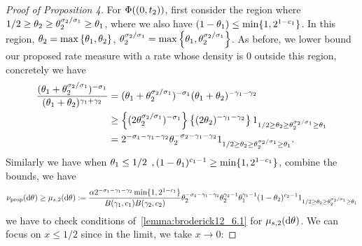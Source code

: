 \begin{proof}[Proof of Proposition 4]
For $\Phi((0, t_2))$, first consider the region where $1/2 \ge \theta_{2} \ge \theta_{2}^{\sigma_{2}/\sigma_{1}}\ge \theta_{1}  $, where we also have $(1-\theta_{1})\le \min\{1, 2^{1-c_{1}}\}$. In this region, $\theta_{2}=\max\left\{\theta_{1},\theta_{2}\right\}$, $\theta_{2}^{\sigma_{2}/\sigma_{1}}=\max\left\{\theta_{1}, \theta_{2}^{\sigma_{2}/\sigma_{1}}\right\}$. As before, we lower bound our proposed rate measure with a rate whose density is 0 outside this region, concretely we have
\begin{align*}
        \frac{(\variantfreqperpop{1}+\variantfreqperpop{2}^{\rate{2}/\rate{1}})^{-\rate{1}}}{(\variantfreqperpop{1}+\variantfreqperpop{2})^{\corr{1}+\corr{2}}}&=(\variantfreqperpop{1}+\variantfreqperpop{2}^{\rate{2}/\rate{1}})^{-\rate{1}}(\variantfreqperpop{1}+\variantfreqperpop{2})^{-\corr{1}-\corr{2}}\\
        &\ge \left\{ (2\variantfreqperpop{2}^{\rate{2}/\rate{1}} )^{-\rate{1}} \right\} \left\{(2\variantfreqperpop{2})^{-\corr{1} - \corr{2}} \right\}\bm{1}_{1/2 \ge \variantfreqperpop{2} \ge \variantfreqperpop{2}^{\rate{2}/\rate{1}}\ge \variantfreqperpop{1}} \\
        &= 2^{-\rate{1}-\corr{1}-\corr{2}} \variantfreqperpop{2}^{-\rate{2}-\corr{1}-\corr{2}}\bm{1}_{1/2 \ge \variantfreqperpop{2} \ge \variantfreqperpop{2}^{\rate{2}/\rate{1}}\ge \variantfreqperpop{1}}.
\end{align*}
Similarly we have when $\theta_{1}\le 1/2$ $,(1-\theta_{1})^{c_{1}-1}\ge \min\{1, 2^{1-c_{1}}\}$, combine the bounds, we have 
\begin{align*}
    \ratemeasproposed(\de\vecvariantfreq{})\ge\mu_{s,2}(\de\vecvariantfreq{}):= \frac{\mass 2^{-\rate{1}-\corr{1}-\corr{2}}\min\{1, 2^{1-\conc{1}}\}}{B(\corr{1}, \conc{1})B(\corr{2}, \conc{2})}\variantfreqperpop{2}^{-\rate{2}-\corr{1}-\corr{2}} \variantfreqperpop{2}^{\corr{2}-1}\variantfreqperpop{1}^{\corr{1}-1}(1-\variantfreqperpop{2})^{\conc{2}-1} \bm{1}_{1/2 \ge \variantfreqperpop{2} \ge \variantfreqperpop{2}^{\rate{2}/\rate{1}}\ge \variantfreqperpop{1}}
\end{align*}
we have to check conditions of~\cref{lemma:broderick12_6.1} for $\mu_{s,2}(\de\vecvariantfreq{})$. We can focus on $x\le 1/2$ since in the limit, we take $x\to 0$:

\end{proof}
